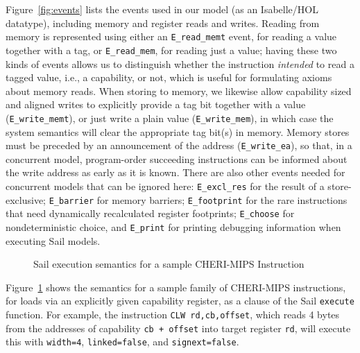\documentclass[11pt]{article}
\theoremstyle{definition}
\begin{document}
Figure~\ref{fig:events} lists the events used in our model (as an Isabelle/HOL
datatype), including memory and register reads and writes.
Reading from memory is represented using either an \texttt{E\_read\_memt} event, for reading a value together with a tag, or \texttt{E\_read\_mem}, for reading just a value;
having these two kinds of events allows us to distinguish whether the instruction \emph{intended} to read a tagged value, i.e., a capability, or not, which is useful for formulating axioms about memory reads.
When storing to memory, we likewise allow capability sized and aligned
writes to explicitly provide a tag bit together with a value
(\texttt{E\_write\_memt}), or just write a plain value
(\texttt{E\_write\_mem}), in which case the system semantics will
clear the appropriate tag bit(s) in memory.  Memory stores must be preceded by an announcement of the address (\texttt{E\_write\_ea}), so that, in a concurrent model, program-order
succeeding instructions can be informed about the write address as early as it
is known.  There are also other events needed for concurrent models
that can be ignored here: \texttt{E\_excl\_res} for the result of a
store-exclusive; \texttt{E\_barrier} for memory barriers;
\texttt{E\_footprint} for the rare instructions that need dynamically
recalculated register footprints; \texttt{E\_choose} for nondeterministic
choice, and \texttt{E\_print} for printing debugging information
when executing Sail models.

\newcommand{\sailfnexecuteCLoad}{ }

\begin{figure}
\sailfnexecuteCLoad
\caption{Sail execution semantics for a sample CHERI-MIPS Instruction}\label{fig:CLoad}
\end{figure}

Figure~\ref{fig:CLoad} shows the semantics for a sample family of CHERI-MIPS
instructions, for loads via an explicitly given capability register,
as a clause of the Sail
\lstinline{execute} function.
For example, the instruction \lstinline{CLW rd,cb,offset}, which 
reads 4 bytes from the addresses of capability \lstinline{cb + offset} into target
register \lstinline{rd}, will execute this with \lstinline{width=4},
\lstinline{linked=false}, and \lstinline{signext=false}.
\end{document}
